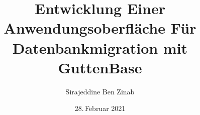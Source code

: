 \makeatletter


\author{Sirajeddine Ben Zinab}

\title{Entwicklung Einer Anwendungsoberfläche Für Datenbankmigration mit GuttenBase}
\subtitle{}

\date{28.\,Februar 2021}





\onehalfspacing

\makeatother
\endinput
